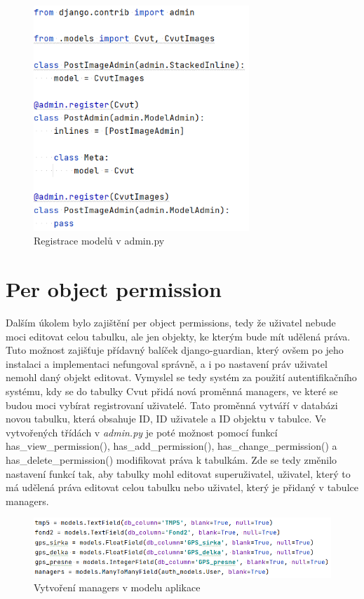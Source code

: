 \begin{figure}[H] \centering
    \includegraphics[width=230pt]{./pictures/12-admin-reg.PNG}
    \caption[Registrace modelů v admin.py]{Registrace modelů v admin.py}
	\label{fig:Registrace modelů v admin.py}              
\end{figure}

\newpage


\section{Per object permission}

Dalším úkolem bylo zajištění per object permissions, tedy že uživatel nebude moci editovat celou tabulku, ale jen objekty, ke kterým bude mít udělená práva. Tuto možnost zajišťuje přídavný balíček django-guardian, který ovšem po jeho instalaci a implementaci nefungoval správně, a i po nastavení práv uživatel nemohl daný objekt editovat. Vymyslel se tedy systém za použití autentifikačního systému, kdy se do tabulky Cvut přidá nová proměnná managers, ve které se budou moci vybírat registrovaní uživatelé. Tato proměnná vytváří v databázi novou tabulku, která obsahuje ID, ID uživatele a ID objektu v tabulce. Ve vytvořených třídách v \emph{admin.py} je poté možnost pomocí funkcí has\_view\_permission(), has\_add\_permission(), has\_change\_permission() a has\_delete\_permission() modifikovat práva k tabulkám. Zde se tedy změnilo nastavení funkcí tak, aby tabulky mohl editovat superuživatel, uživatel, který to má udělená práva editovat celou tabulku nebo uživatel, který je přidaný v tabulce managers. 

\begin{figure}[H] \centering
    \includegraphics[width=330pt]{./pictures/11-managers-model.PNG}
    \caption[Vytvoření managers v modelu aplikace]{Vytvoření managers v modelu aplikace}
	\label{fig:Vytvoření managers v modelu aplikace}              
\end{figure}

